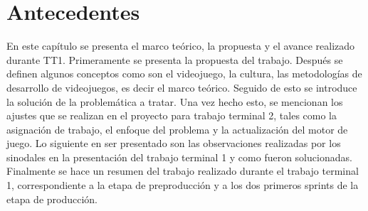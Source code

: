 \chapter{Antecedentes}
En este capítulo se presenta el marco teórico, la propuesta y el avance realizado 
durante TT1. Primeramente se presenta la propuesta del trabajo. Después se 
definen algunos conceptos como son el videojuego, la cultura, las metodologías 
de desarrollo de videojuegos, es decir el marco teórico. Seguido de esto se 
introduce la solución de la problemática a tratar. Una vez hecho esto, se 
mencionan los ajustes que se realizan en el proyecto para trabajo terminal 2,
tales como la asignación de trabajo, el enfoque del problema y la actualización 
del motor de juego. Lo siguiente en ser presentado son las observaciones 
realizadas por los sinodales en la presentación del trabajo terminal 1 y como 
fueron solucionadas. Finalmente se hace un resumen del trabajo
realizado durante el trabajo terminal 1, correspondiente a la etapa de
preproducción y a los dos primeros sprints de la etapa de producción.  






